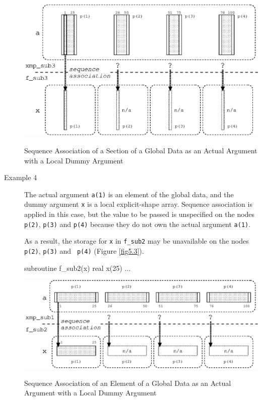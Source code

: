 \begin{description}
\begin{myfigure}
 \includegraphics[scale=0.7]{figs/fig5.25.eps}
 \caption{Sequence Association of a Section of a Global Data as an
 Actual Argument with a Local Dummy Argument}
 \label{fig5.25}
\end{myfigure}

\item[Example 4]

	   The actual argument {\tt a(1)} is an element of the global
	   data, and the dummy argument {\tt x} is a local
	   explicit-shape array. Sequence association is applied 
	   in this case, but the value to be passed is unspecified on 
	   the nodes {\tt p(2)}, {\tt p(3)} and {\tt p(4)} because they
	   do not own the actual argument {\tt a(1)}.

	   As a result, the storage for {\tt x} in {\tt f\_sub2} may be
	   unavailable on the nodes {\tt p(2)}, {\tt p(3)} and {\tt
	   p(4)} (Figure \ref{fig5.3}).

\begin{Fexample}
      subroutine f_sub2(x)
      real x(25)
      ...
\end{Fexample}

\begin{myfigure}
 \includegraphics[scale=0.7]{figs/fig5.3.eps}
 \caption{Sequence Association of an Element of a Global Data as an
 Actual Argument with a Local Dummy Argument}
 \label{fig5.3}
\end{myfigure}


\end{description}

